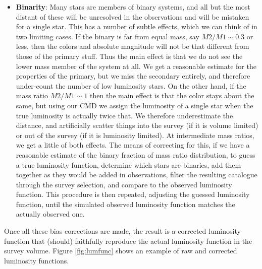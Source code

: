 \documentclass[a4paper,10pt]{article}
\begin{document}
\begin{itemize}
    \item \textbf{Binarity}: Many stars are members of binary systems, and all but the most distant of these will be unresolved in the observations and will be mistaken for a single star. This has a number of subtle effects, which we can think of in two limiting cases. If the binary is far from equal mass, say $M2/M1\sim0.3$ or less, then the colors and absolute magnitude will not be that different from those of the primary stuff. Thus the main effect is that we do not see the lower mass member of the system at all. We get a reasonable estimate for the properties of the primary, but we miss the secondary entirely, and therefore under-count the number of low luminosity stars. On the other hand, if the mass ratio $M2/M1\sim1$ then the main effect is that the color stays about the same, but using our CMD we assign the luminosity of a single star when the true luminosity is actually twice that. We therefore underestimate the distance, and artificially scatter things into the survey (if it is volume limited) or out of the survey (if it is luminosity limited). At intermediate mass ratios, we get a little of both effects. The means of correcting for this, if we have a reasonable estimate of the binary fraction of mass ratio distribution, to guess a true luminosity function, determine which stars are binaries, add them together as they would be added in observations, filter the resulting catalogue through the survey selection, and compare to the observed luminosity function. This procedure is then repeated, adjusting the guessed luminosity function, until the simulated observed luminosity function matches the actually observed one.
\end{itemize}

{\noindent}Once all these bias corrections are made, the result is a corrected luminosity function that (should) faithfully reproduce the actual luminosity function in the survey volume. Figure \ref{fig:lumfunc} shows an example of raw and corrected luminosity functions.
\end{document}
